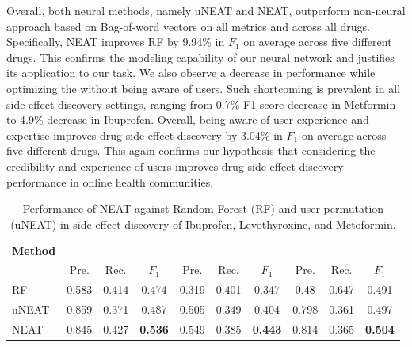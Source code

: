 \documentclass{bmcart}
\begin{document}
Overall, both neural methods, namely uNEAT and NEAT, outperform non-neural approach based on Bag-of-word vectors on all metrics and across all drugs. Specifically, NEAT improves RF by 9.94\% in $F_1$ on average across five different drugs. This confirms the modeling capability of our neural network and justifies its application to our task. We also observe a decrease in performance while optimizing the without being aware of users. Such shortcoming is prevalent in all side effect discovery settings, ranging from 0.7\% F1 score decrease in Metformin to 4.9\% decrease in Ibuprofen. Overall, being aware of user experience and expertise improves drug side effect discovery by 3.04\% in $F_1$ on average across five different drugs. This again confirms our hypothesis that considering the credibility and experience of users improves drug side effect discovery performance in online health communities.

\begin{table}[t!]
  \captionsetup{justification=centering}
  \centering
  \scalebox{1.2}
  \footnotesize
  \begin{tabular}{l||c|c|c|c|c|c|c|c|c}
    \hline
    \textbf{Method}& 
    \multicolumn{3}{c|}{\centering{Ibuprofen}} & \multicolumn{3}{c|}{\centering{Levothyroxine}} & \multicolumn{3}{c}{\centering{Metoformin}}\\
    & Pre. & Rec. & $F_1$ & Pre. & Rec. & $F_1$ & Pre. & Rec. & $F_1$ \\ \hline \hline
    RF & 0.583 & 0.414 & 0.474 & 0.319 & 0.401 & 0.347 & 0.48 & 0.647 & 0.491 \\ \hline
    uNEAT & 0.859 & 0.371 & 0.487 & 0.505 & 0.349 & 0.404 & 0.798 & 0.361 & 0.497 \\ \hline
    NEAT & 0.845 & 0.427 & \textbf{0.536} & 0.549 & 0.385 & \textbf{0.443} & 0.814 & 0.365 & \textbf{0.504} \\ \hline
  \end{tabular}
  \caption{Performance of NEAT against Random Forest (RF) and user permutation (uNEAT) in side effect discovery of Ibuprofen, Levothyroxine, and Metoformin.}\label{table:se_discovery1}
\end{table}
\end{document}
